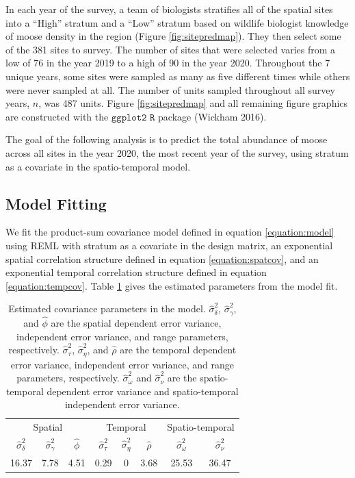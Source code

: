 \documentclass[smallextended]{svjour3}       %
\begin{document}
In each year of the survey, a team of biologists stratifies all of the
spatial sites into a ``High'' stratum and a ``Low'' stratum based on
wildlife biologist knowledge of moose density in the region (Figure
\ref{fig:sitepredmap}). They then select some of the 381 sites to
survey. The number of sites that were selected varies from a low of 76
in the year 2019 to a high of 90 in the year 2020. Throughout the 7
unique years, some sites were sampled as many as five different times
while others were never sampled at all. The number of units sampled
throughout all survey years, \(n\), was 487 units. Figure
\ref{fig:sitepredmap} and all remaining figure graphics are constructed
with the \(\texttt{ggplot2 R}\) package (Wickham 2016).

The goal of the following analysis is to predict the total abundance of
moose across all sites in the year 2020, the most recent year of the
survey, using stratum as a covariate in the spatio-temporal model.

\hypertarget{subsection:modelfit}{%
\subsection{Model Fitting}\label{subsection:modelfit}}

We fit the product-sum covariance model defined in equation
\ref{equation:model} using REML with stratum as a covariate in the
design matrix, an exponential spatial correlation structure defined in
equation \ref{equation:spatcov}, and an exponential temporal correlation
structure defined in equation \ref{equation:tempcov}. Table
\ref{tab:paramest} gives the estimated parameters from the model fit.

\begin{table}[H]

\caption{\label{tab:paramest}Estimated covariance parameters in the model. $\hat{\sigma}^2_{\delta}$, $\hat{\sigma}^2_{\gamma}$, and $\hat{\phi}$ are the spatial dependent error variance, independent error variance, and range parameters, respectively. $\hat{\sigma}^2_{\tau}$, $\hat{\sigma}^2_{\eta}$, and $\hat{\rho}$ are the temporal dependent error variance, independent error variance, and range parameters, respectively. $\hat{\sigma}^2_{\omega}$ and $\hat{\sigma}^2_{\nu}$ are the spatio-temporal dependent error variance and spatio-temporal independent error variance.}
\centering
\begin{tabular}[t]{cccccccc}
\toprule
\multicolumn{3}{c}{Spatial} & \multicolumn{3}{c}{Temporal} & \multicolumn{2}{c}{Spatio-temporal} \\
\cmidrule(l{3pt}r{3pt}){1-3} \cmidrule(l{3pt}r{3pt}){4-6} \cmidrule(l{3pt}r{3pt}){7-8}
$\hat{\sigma}^2_{\delta}$ & $\hat{\sigma}^2_{\gamma}$ & $\hat{\phi}$ & $\hat{\sigma}^2_{\tau}$ & $\hat{\sigma}^2_{\eta}$ & $\hat{\rho}$ & $\hat{\sigma}^2_{\omega}$ & $\hat{\sigma}^2_{\nu}$\\
\midrule
16.37 & 7.78 & 4.51 & 0.29 & 0 & 3.68 & 25.53 & 36.47\\
\bottomrule
\end{tabular}
\end{table}
\end{document}
